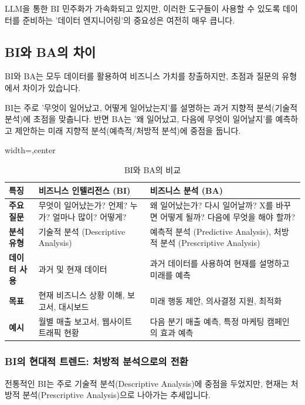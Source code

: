 \documentclass[11pt,a4paper]{article}
\begin{document}
\begin{tcolorbox}[mywarning={데이터 엔지니어링의 중요성}]
LLM을 통한 BI 민주화가 가속화되고 있지만, 이러한 도구들이 사용할 수 있도록 데이터를 준비하는 '데이터 엔지니어링'의 중요성은 여전히 매우 큽니다.
\end{tcolorbox}

\subsection{BI와 BA의 차이}
BI와 BA는 모두 데이터를 활용하여 비즈니스 가치를 창출하지만, 초점과 질문의 유형에서 차이가 있습니다.

\begin{tcolorbox}[mybox={핵심 요약: 과거 vs. 미래}]
BI는 주로 '무엇이 일어났고, 어떻게 일어났는지'를 설명하는 과거 지향적 분석(기술적 분석)에 초점을 맞춥니다. 반면 BA는 '왜 일어났고, 다음에 무엇이 일어날지'를 예측하고 제안하는 미래 지향적 분석(예측적/처방적 분석)에 중점을 둡니다.
\end{tcolorbox}

\begin{table}[h!]
\centering
\caption{BI와 BA의 비교}
\label{tab:bi_ba_comparison}
\begin{adjustbox}{width=\textwidth,center}
\begin{tabular}{p{}p{}p{}}
\toprule
\textbf{특징} & \textbf{비즈니스 인텔리전스 (BI)} & \textbf{비즈니스 분석 (BA)} \\
\midrule
\textbf{주요 질문} & 무엇이 일어났는가? 언제? 누가? 얼마나 많이? 어떻게? & 왜 일어났는가? 다시 일어날까? X를 바꾸면 어떻게 될까? 다음에 무엇을 해야 할까? \\
\textbf{분석 유형} & 기술적 분석 (Descriptive Analysis) & 예측적 분석 (Predictive Analysis), 처방적 분석 (Prescriptive Analysis) \\
\textbf{데이터 사용} & 과거 및 현재 데이터 & 과거 데이터를 사용하여 현재를 설명하고 미래를 예측 \\
\textbf{목표} & 현재 비즈니스 상황 이해, 보고서, 대시보드 & 미래 행동 제안, 의사결정 지원, 최적화 \\
\textbf{예시} & 월별 매출 보고서, 웹사이트 트래픽 현황 & 다음 분기 매출 예측, 특정 마케팅 캠페인의 효과 예측 \\
\bottomrule
\end{tabular}
\end{adjustbox}
\end{table}

\subsubsection{BI의 현대적 트렌드: 처방적 분석으로의 전환}
전통적인 BI는 주로 기술적 분석(Descriptive Analysis)에 중점을 두었지만, 현재는 처방적 분석(Prescriptive Analysis)으로 나아가는 추세입니다.
\end{document}

